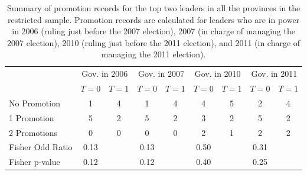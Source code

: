 \begin{table}[ht]
\centering
\begin{tabular}{lcccccccc}
   & \multicolumn{2}{c}{Gov. in 2006} & \multicolumn{2}{c}{Gov. in 2007} & \multicolumn{2}{c}{Gov. in 2010} & \multicolumn{2}{c}{Gov. in 2011} \\
 & $T = 0$ & $T = 1$ & $T = 0$ & $T = 1$ & $T = 0$ & $T = 1$ & $T = 0$ & $T = 1$ \\
 \hline
No Promotion & 1 & 4 & 1 & 4 & 4 & 5 & 2 & 4 \\ 
  1 Promotion & 5 & 2 & 5 & 2 & 3 & 2 & 5 & 2 \\ 
  2 Promotions & 0 & 0 & 0 & 0 & 2 & 1 & 2 & 2 \\ 
   \hline
Fisher Odd Ratio & 0.13 &  & 0.13 &  & 0.50 &  & 0.31 &  \\ 
  Fisher p-value & 0.12 &  & 0.12 &  & 0.40 &  & 0.25 &  \\ 
  \end{tabular}
\caption{Summary of promotion records for the top two leaders in all the provinces in the restricted sample. 
             Promotion records are calculated for leaders who are in power in 2006 (ruling just before the 2007 election), 2007 (in charge of managing the 2007 election),
             2010 (ruling just before the 2011 election), and 2011 (in charge of managing the 2011 election).} 
\label{tab:promo_mech}
\end{table}
